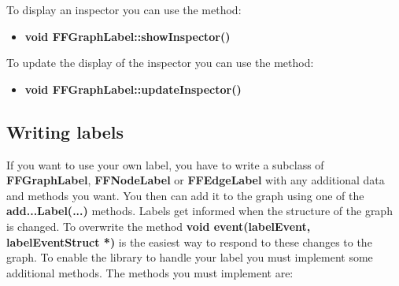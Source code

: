 To display an inspector you can use the method:

\begin{itemize}

\item{\bf void FFGraphLabel::showInspector()}

\end{itemize}

To update the display of the inspector you can use the method:

\begin{itemize}

\item{\bf void FFGraphLabel::updateInspector()}

\end{itemize}

\subsection{Writing labels}
\label{writing_labels}

If you want to use your own label, you have to write a subclass
of {\bf FFGraphLabel}, {\bf FFNodeLabel} or {\bf FFEdgeLabel}
with any additional data and methods you want. You then can add
it to the graph using one of the {\bf add...Label(...)} methods.
Labels get informed when the structure of the graph is changed.
To overwrite the method {\bf void event(labelEvent,
  labelEventStruct *)} is the easiest way to respond to these
changes to the graph. To enable the library to handle your label
you must implement some additional methods. The methods you must
implement are:

